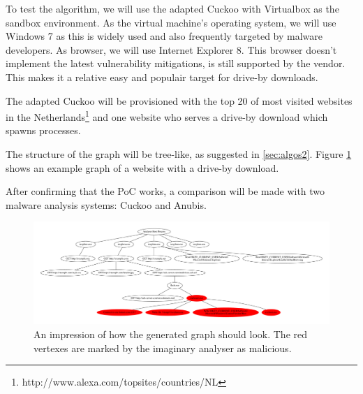To test the algorithm, we will use the adapted Cuckoo with Virtualbox as the sandbox environment. As the virtual machine's operating system, we will use Windows 7 as this is widely used and also frequently targeted by malware developers. As browser, we will use Internet Explorer 8. This browser doesn't implement the latest vulnerability mitigations, is still supported by the vendor. This makes it a relative easy and populair target for drive-by downloads. %

The adapted Cuckoo will be provisioned with the top 20 of most visited websites in the Netherlands\footnote{http://www.alexa.com/topsites/countries/NL} and one website who serves a drive-by download which spawns processes.

The structure of the graph will be tree-like, as suggested in \ref{sec:algos2}. Figure \ref{fig:alg_tree} shows an example graph of a website with a drive-by download.

After confirming that the PoC works, a comparison will be made with two malware analysis systems: Cuckoo and Anubis.

\pagebreak

\begin{figure}[h]
    \centering
    \centerline{\includegraphics[width=25cm,angle=90]{Images/alg_tree}}
    \caption{An impression of how the generated graph should look. The red vertexes are marked by the imaginary analyser as malicious.}
    \label{fig:alg_tree}
\end{figure}

\pagebreak

\restoregeometry
{}
\setcounter{page}{\thesavepage}
